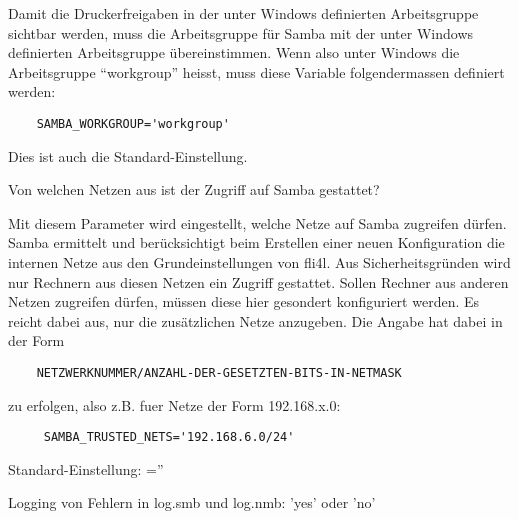 \begin{description}

    Damit die Druckerfreigaben in der unter Windows definierten Arbeitsgruppe
    sichtbar werden, muss die Arbeitsgruppe für Samba mit der unter Windows
    definierten Arbeitsgruppe übereinstimmen. Wenn also unter Windows die
    Arbeitsgruppe ``workgroup'' heisst, muss diese Variable folgendermassen
    definiert werden:

\begin{example}
\begin{verbatim}
    SAMBA_WORKGROUP='workgroup'
\end{verbatim}
\end{example}

    Dies ist auch die Standard-Einstellung.


    Von welchen Netzen aus ist der Zugriff auf Samba gestattet?

    Mit diesem Parameter wird eingestellt, welche Netze auf Samba zugreifen
    dürfen.
    Samba ermittelt und berücksichtigt beim Erstellen einer neuen
    Konfiguration die internen Netze aus den Grundeinstellungen von
    fli4l. Aus Sicherheitsgründen wird nur Rechnern aus diesen Netzen
    ein Zugriff gestattet.
    Sollen Rechner aus anderen Netzen zugreifen dürfen, müssen diese hier
    gesondert konfiguriert werden. Es reicht dabei aus, nur die
    zusätzlichen Netze anzugeben.
    Die Angabe hat dabei in der Form

\begin{example}
\begin{verbatim}
    NETZWERKNUMMER/ANZAHL-DER-GESETZTEN-BITS-IN-NETMASK
\end{verbatim}
\end{example}

     zu erfolgen, also z.B. fuer Netze der Form 192.168.x.0:

\begin{example}
\begin{verbatim}
     SAMBA_TRUSTED_NETS='192.168.6.0/24'
\end{verbatim}
\end{example}

    Standard-Einstellung: =''


 Logging von Fehlern in log.smb und log.nmb:
    'yes' oder 'no'


\end{description}
